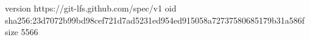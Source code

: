 version https://git-lfs.github.com/spec/v1
oid sha256:23d7072b99bd98cef721d7ad5231ed954ed915058a72737580685179b31a586f
size 5566
